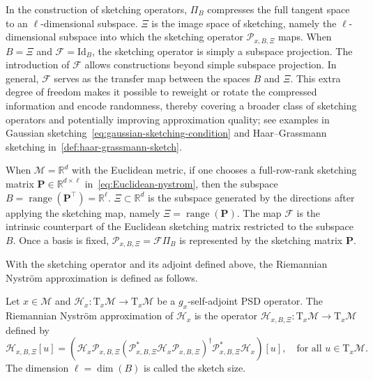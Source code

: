 \documentclass[final,onefignum,onetabnum]{siamart250211}
\begin{document}
In the construction of sketching operators, $\Pi_B$ compresses the full tangent space to an $\ell$-dimensional subspace. $\Xi$ is the image space of sketching, namely the $\ell$-dimensional subspace into which the sketching operator $\mathcal{P}_{x, B, \Xi}$ maps. When $B = \Xi$ and $\mathcal{F} = \mathrm{Id}_B$, the sketching operator is simply a subspace projection. The introduction of
$\mathcal{F}$ allows constructions beyond simple subspace projection. In general,
$\mathcal{F}$ serves as the transfer map between the spaces $B$ and $\Xi$. This extra degree of freedom makes it possible to reweight or rotate the compressed information and encode randomness, thereby covering a broader class of sketching operators and potentially improving approximation quality; see examples in Gaussian sketching~\eqref{eq:gaussian-sketching-condition} and Haar--Grassmann sketching in~\cref{def:haar-grassmann-sketch}.

When $\mathcal M=\mathbb R^d$ with the Euclidean metric, if one chooses a full-row-rank sketching matrix $\mathbf{P} \in\mathbb R^{d\times \ell}$ in~\eqref{eq:Euclidean-nystrom}, then the subspace
$B=\operatorname{range} (\mathbf{P}^\top) = \mathbb R^{\ell}$. $\Xi\subset \mathbb R^d$ is the subspace generated by the directions after applying the sketching map, namely
$\Xi=\operatorname{range}(\mathbf{P})$.
The map $\mathcal F$ is the intrinsic counterpart of the Euclidean sketching matrix restricted to the subspace $B$. Once a basis is fixed, $\mathcal{P}_{x, B, \Xi} = \mathcal{F} \Pi_B$ is represented by the sketching matrix $\mathbf{P}$. 

With the sketching operator and its adjoint defined above, the Riemannian Nystr\"om approximation is defined as follows.
\begin{definition}
\label{def:Riemannian-nystrom}
  Let $x\in\mathcal M$ and $\mathcal{H}_x:\mathrm T_x\mathcal M\to\mathrm T_x\mathcal M$ be a $g_x$-self-adjoint PSD operator.
  The Riemannian Nystr\"om approximation of $\mathcal{H}_x$ is the operator $\mathcal{H}_{x,B,\Xi}:\mathrm T_x\mathcal M\to\mathrm T_x\mathcal M$ defined by
\begin{equation}
  \label{eq:Nystrom-Hessian}
\mathcal{H}_{x, B, \Xi}[u]=\left(\mathcal{H}_x \mathcal{P}_{x, B, \Xi}\left(\mathcal{P}_{x, B, \Xi}^{*} \mathcal{H}_x \mathcal{P}_{x, B, \Xi}\right)^{\dagger} \mathcal{P}_{x, B, \Xi}^{*} \mathcal{H}_x\right)[u], \quad \text{for all } u \in \mathrm{T}_x \mathcal{M}.
\end{equation}
  The dimension $\ell=\dim(B)$ is called the sketch size.
\end{definition}
\end{document}
